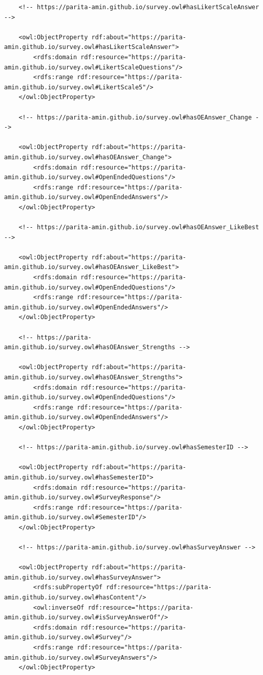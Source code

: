 \begin{lstlisting}
    <!-- https://parita-amin.github.io/survey.owl#hasLikertScaleAnswer -->

    <owl:ObjectProperty rdf:about="https://parita-amin.github.io/survey.owl#hasLikertScaleAnswer">
        <rdfs:domain rdf:resource="https://parita-amin.github.io/survey.owl#LikertScaleQuestions"/>
        <rdfs:range rdf:resource="https://parita-amin.github.io/survey.owl#LikertScale5"/>
    </owl:ObjectProperty>
    
    <!-- https://parita-amin.github.io/survey.owl#hasOEAnswer_Change -->

    <owl:ObjectProperty rdf:about="https://parita-amin.github.io/survey.owl#hasOEAnswer_Change">
        <rdfs:domain rdf:resource="https://parita-amin.github.io/survey.owl#OpenEndedQuestions"/>
        <rdfs:range rdf:resource="https://parita-amin.github.io/survey.owl#OpenEndedAnswers"/>
    </owl:ObjectProperty>
   
    <!-- https://parita-amin.github.io/survey.owl#hasOEAnswer_LikeBest -->

    <owl:ObjectProperty rdf:about="https://parita-amin.github.io/survey.owl#hasOEAnswer_LikeBest">
        <rdfs:domain rdf:resource="https://parita-amin.github.io/survey.owl#OpenEndedQuestions"/>
        <rdfs:range rdf:resource="https://parita-amin.github.io/survey.owl#OpenEndedAnswers"/>
    </owl:ObjectProperty>
    
    <!-- https://parita-amin.github.io/survey.owl#hasOEAnswer_Strengths -->

    <owl:ObjectProperty rdf:about="https://parita-amin.github.io/survey.owl#hasOEAnswer_Strengths">
        <rdfs:domain rdf:resource="https://parita-amin.github.io/survey.owl#OpenEndedQuestions"/>
        <rdfs:range rdf:resource="https://parita-amin.github.io/survey.owl#OpenEndedAnswers"/>
    </owl:ObjectProperty>
    
    <!-- https://parita-amin.github.io/survey.owl#hasSemesterID -->

    <owl:ObjectProperty rdf:about="https://parita-amin.github.io/survey.owl#hasSemesterID">
        <rdfs:domain rdf:resource="https://parita-amin.github.io/survey.owl#SurveyResponse"/>
        <rdfs:range rdf:resource="https://parita-amin.github.io/survey.owl#SemesterID"/>
    </owl:ObjectProperty>
    
    <!-- https://parita-amin.github.io/survey.owl#hasSurveyAnswer -->

    <owl:ObjectProperty rdf:about="https://parita-amin.github.io/survey.owl#hasSurveyAnswer">
        <rdfs:subPropertyOf rdf:resource="https://parita-amin.github.io/survey.owl#hasContent"/>
        <owl:inverseOf rdf:resource="https://parita-amin.github.io/survey.owl#isSurveyAnswerOf"/>
        <rdfs:domain rdf:resource="https://parita-amin.github.io/survey.owl#Survey"/>
        <rdfs:range rdf:resource="https://parita-amin.github.io/survey.owl#SurveyAnswers"/>
    </owl:ObjectProperty>
    

\end{lstlisting}
